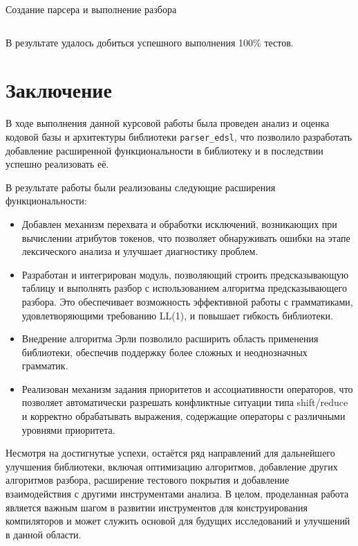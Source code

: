 \documentclass[14pt, russian]{scrartcl}
\newcommand{\anonsection}[1]{\cleardoublepage
\phantomsection
\addcontentsline{toc}{section}{\protect\numberline{}#1}
\section*{#1}\vspace*{2.5ex} %
}
\begin{document}
\begin{listing}[H]
	\caption{Создание парсера и выполнение разбора}
	\label{lst:ghact}
	\inputminted[style=bw, frame=single,fontsize = \footnotesize, linenos=false, xleftmargin = 1.5em]{python}{./listings/a.yaml}
\end{listing}

В результате удалось добиться успешного выполнения 100\% тестов.

\anonsection{Заключение}

В ходе выполнения данной курсовой работы была проведен анализ и оценка кодовой базы и архитектуры библиотеки
\texttt{parser\_edsl}, что позволило разработать добавление расширенной функциональности в библиотеку и в последствии
успешно реализовать её.

В результате работы были реализованы следующие расширения функциональности:

\begin{itemize}
	\item Добавлен механизм перехвата и обработки исключений, возникающих при вычислении атрибутов токенов,
	что позволяет обнаруживать ошибки на этапе лексического анализа и улучшает диагностику проблем.
	\item Разработан и интегрирован модуль, позволяющий строить предсказывающую таблицу и выполнять разбор
	с использованием алгоритма предсказывающего разбора. Это обеспечивает возможность эффективной работы с
	грамматиками, удовлетворяющими требованию LL(1), и повышает гибкость библиотеки.
	\item Внедрение алгоритма Эрли позволило расширить область применения библиотеки,
	обеспечив поддержку более сложных и неоднозначных грамматик.
	\item Реализован механизм задания приоритетов и ассоциативности операторов, что позволяет автоматически
	разрешать конфликтные ситуации типа shift/reduce и корректно обрабатывать выражения,
	содержащие операторы с различными уровнями приоритета.
\end{itemize}

Несмотря на достигнутые успехи, остаётся ряд направлений для дальнейшего улучшения библиотеки, включая оптимизацию
алгоритмов, добавление других алгоритмов разбора, расширение тестового покрытия и добавление взаимодействия
с другими инструментами анализа. В целом, проделанная работа является важным шагом в развитии инструментов
для конструирования компиляторов и может служить основой для будущих исследований и улучшений в данной области.
\end{document}
